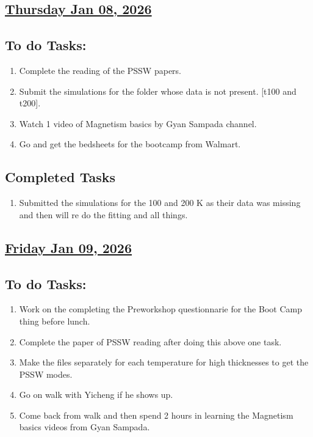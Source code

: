 \subsection*{\underline{Thursday Jan 08, 2026}}
\subsection*{To do Tasks:}
\begin{enumerate}
    \item Complete the reading of the PSSW papers. \cmark
    \item Submit the simulations for the folder whose data is not present. [t100 and t200]. \cmark
    \item Watch 1 video of Magnetism basics by Gyan Sampada channel.
    \item Go and get the bedsheets for the bootcamp from Walmart. \cmark
\end{enumerate}
\subsection*{Completed Tasks}
\begin{enumerate}[\ding{52}]  %
    \item Submitted the simulations for the 100 and 200 K as their data was missing and then will re do the fitting and all things.
\end{enumerate}
\subsection*{\underline{Friday Jan 09, 2026}}
\subsection*{To do Tasks:}
\begin{enumerate}
    \item Work on the completing the Preworkshop questionnarie for the Boot Camp thing before lunch. \cmark  
    \item Complete the paper of PSSW reading after doing this above one task. \cmark
    \item Make the files separately for each temperature for high thicknesses to get the PSSW modes. \xmark
    \item Go on walk with Yicheng if he shows up. \cmark
    \item Come back from walk and then spend 2 hours in learning the Magnetism basics videos from Gyan Sampada.\xmark
\end{enumerate}
